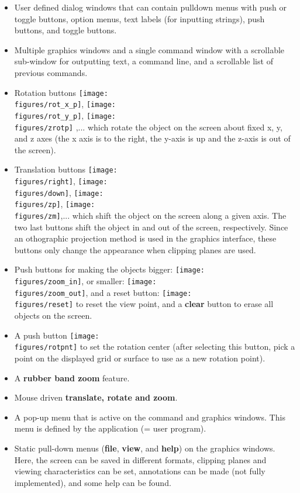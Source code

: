 \begin{itemize}
%
  \item User defined dialog windows that can contain pulldown menus
  with push or toggle buttons, option menus, text labels (for
  inputting strings), push buttons, and toggle buttons.
%
  \item Multiple graphics windows and a single command window with a
  scrollable sub-window for outputting text, a command line, and a
  scrollable list of previous commands.
%
  \item Rotation buttons 
     \texttt{[image: \\figures/rot\_x\_p]},
     \texttt{[image: \\figures/rot\_y\_p]}, 
     \texttt{[image: \\figures/zrotp]} ,... which
     rotate the object on the screen about fixed x, y, and z axes (the
     x axis is to the right, the y-axis is up and the z-axis is out of
     the screen).
%
  \item Translation buttons \texttt{[image: \\figures/right]},
  \texttt{[image: \\figures/down]}, 
  \texttt{[image: \\figures/zp]},
  \texttt{[image: \\figures/zm]},... which shift
  the object on the screen along a given axis. The two last buttons
  shift the object in and out of the screen, respectively. Since an
  othographic projection method is used in the graphics interface, these buttons only change
  the appearance when clipping planes are used.
%
  \item Push buttons for making the objects bigger:
  \texttt{[image: \\figures/zoom\_in]}, 
  or smaller: \texttt{[image: \\figures/zoom\_out]},
  and a reset button: \texttt{[image: \\figures/reset]} to reset the view point, and a {\bf clear} button
  to erase all objects on the
  screen.
%
  \item A push button \texttt{[image: \\figures/rotpnt]} to set the rotation center (after selecting this
    button, pick a point on the displayed grid or surface to use as a new rotation point).
%
  \item A {\bf rubber band zoom} feature.
%
  \item Mouse driven {\bf translate, rotate and zoom}.
%
  \item A pop-up menu that is active on the command and graphics
  windows. This menu is defined by the application (= user program).
%
  \item Static pull-down menus ({\bf file}, {\bf view},
     and {\bf help}) on the graphics windows. Here, the screen can be saved in
     different formats, clipping planes and viewing characteristics
     can be set, annotations can be made (not fully implemented), and some help can be found. 

\end{itemize}
